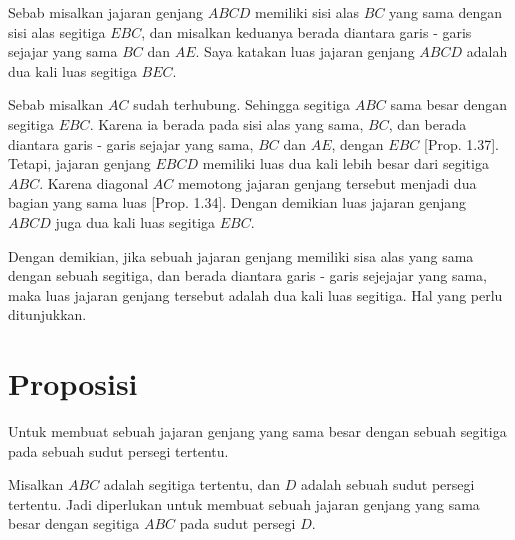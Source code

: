 \documentclass[a4paper]{book}
\begin{document}
\begin{center}
\end{center}

Sebab misalkan jajaran genjang $ABCD$ memiliki sisi alas $BC$ yang sama dengan
sisi alas segitiga $EBC$, dan misalkan keduanya berada diantara garis - garis
sejajar yang sama $BC$ dan $AE$. Saya katakan luas jajaran genjang $ABCD$ 
adalah dua kali luas segitiga $BEC$.

Sebab misalkan $AC$ sudah terhubung. Sehingga segitiga $ABC$ sama besar
dengan segitiga $EBC$. Karena ia berada pada sisi alas yang sama, $BC$, dan 
berada diantara garis - garis sejajar yang sama, $BC$ dan $AE$, dengan $EBC$
[Prop. 1.37]. Tetapi, jajaran genjang $EBCD$ memiliki luas dua kali lebih
besar dari segitiga $ABC$. Karena diagonal $AC$ memotong jajaran genjang 
tersebut menjadi dua bagian yang sama luas [Prop. 1.34]. Dengan demikian 
luas jajaran genjang $ABCD$  juga dua kali luas segitiga $EBC$.

Dengan demikian, jika sebuah jajaran genjang memiliki sisa alas yang sama
dengan sebuah segitiga, dan berada diantara garis - garis sejejajar yang
sama, maka luas jajaran genjang tersebut adalah dua kali luas segitiga.
Hal yang perlu ditunjukkan.

\section*{\centering Proposisi \thesection} 
Untuk membuat sebuah jajaran genjang yang sama besar dengan sebuah segitiga
pada sebuah sudut persegi tertentu.
\begin{center}
\end{center}
Misalkan $ABC$ adalah segitiga tertentu, dan $D$ adalah sebuah sudut 
persegi tertentu. Jadi diperlukan untuk membuat sebuah jajaran genjang
yang sama besar dengan segitiga $ABC$ pada sudut persegi $D$.
\end{document}
